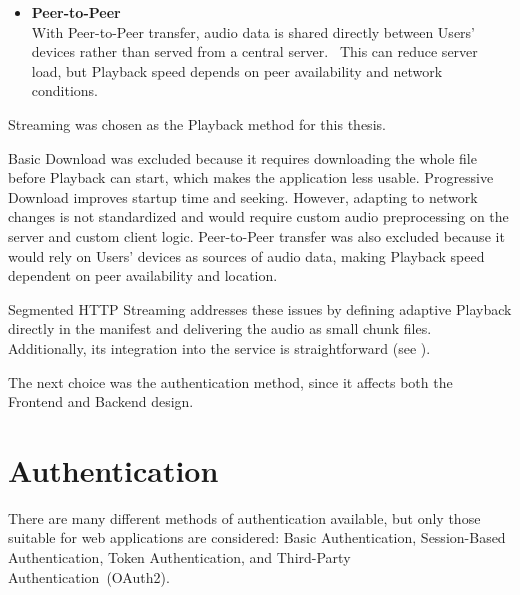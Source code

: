 \begin{itemize}
    The original audio file can also be encoded into several versions of
    different size and quality, all referenced by the same manifest.
    The client picks chunks based on network conditions or device capabilities,
    and since each chunk is a separate HTTP resource, retries and caching are
    handled efficiently by standard HTTP caches and
    CDNs.~\parencite{cdn_caching}

    \item \textbf{Peer-to-Peer}\\
    With Peer-to-Peer transfer, audio data is shared directly between Users'
    devices rather than served from a central server.~\parencite{p2p_computing}
    This can reduce server load, but Playback speed depends on peer availability
    and network conditions.
\end{itemize}

Streaming was chosen as the Playback method for this thesis.

Basic Download was excluded because it requires downloading the whole file
before Playback can start, which makes the application less usable.
Progressive Download improves startup time and seeking. However, adapting to network
changes is not standardized and would require custom audio preprocessing on the server
and custom client logic.
Peer-to-Peer transfer was also excluded because it would rely on Users' devices as sources of audio data,
making Playback speed dependent on peer availability and location.

Segmented HTTP Streaming addresses these issues by defining adaptive Playback directly in
the manifest and delivering the audio as small chunk files.
Additionally, its integration into the service is straightforward
(see ).

The next choice was the authentication method, since it affects both the Frontend
and Backend design.


\section{Authentication}
There are many different methods of authentication available, but only those suitable for
web applications are considered: Basic Authentication, Session-Based Authentication,
Token Authentication, and Third-Party Authentication~(OAuth2).

